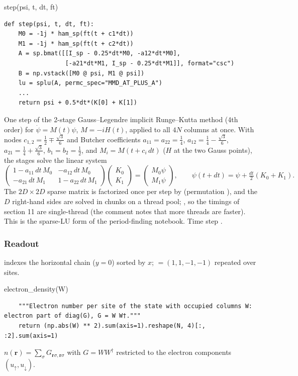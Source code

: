 \begin{function}{step(psi, t, dt, ft)}
\begin{Verbatim}
def step(psi, t, dt, ft):
    M0 = -1j * ham_sp(ft(t + c1*dt))
    M1 = -1j * ham_sp(ft(t + c2*dt))
    A = sp.bmat([[I_sp - 0.25*dt*M0, -a12*dt*M0],
                 [-a21*dt*M1, I_sp - 0.25*dt*M1]], format="csc")
    B = np.vstack([M0 @ psi, M1 @ psi])
    lu = splu(A, permc_spec="MMD_AT_PLUS_A")
    ...
    return psi + 0.5*dt*(K[0] + K[1])
\end{Verbatim}
One step of the 2-stage Gauss--Legendre implicit Runge--Kutta method (4th order) for $\dot\psi = M(t)\psi$, $M = -iH(t)$, applied to all
$4N$ columns at once. With nodes $c_{1,2} = \tfrac12\mp\tfrac{\sqrt3}{6}$ and Butcher coefficients $a_{11} = a_{22} = \tfrac14$,
$a_{12} = \tfrac14-\tfrac{\sqrt3}{6}$, $a_{21} = \tfrac14+\tfrac{\sqrt3}{6}$, $b_1 = b_2 = \tfrac12$, and $M_i = M(t + c_i\,dt)$ ($H$ at the two Gauss
points), the stages solve the linear system
\[
\begin{pmatrix} 1 - a_{11}\,dt\,M_0 & -a_{12}\,dt\,M_0\\ -a_{21}\,dt\,M_1 & 1 - a_{22}\,dt\,M_1\end{pmatrix}
\begin{pmatrix}K_0\\K_1\end{pmatrix} = \begin{pmatrix}M_0\psi\\ M_1\psi\end{pmatrix},
\qquad \psi(t+dt) = \psi + \tfrac{dt}{2}(K_0 + K_1).
\]
The $2D\times2D$ sparse matrix is factorized once per step by  (permutation ), and the $D$ right-hand sides are
solved in  chunks on a thread pool; , so the timings of section 11 are single-thread (the comment notes
that more threads are faster). This is the sparse-LU form of the period-finding notebook. Time step .
\end{function}

\subsubsection*{Readout}

 indexes the horizontal chain ($y = 0$) sorted by $x$;  $= (1,1,-1,-1)$ repeated over sites.

\begin{function}{electron\_density(W)}
\begin{Verbatim}
    """Electron number per site of the state with occupied columns W: electron part of diag(G), G = W W†."""
    return (np.abs(W) ** 2).sum(axis=1).reshape(N, 4)[:, :2].sum(axis=1)
\end{Verbatim}
$n(\mathbf r) = \sum_{\sigma}G_{\mathbf r\sigma,\mathbf r\sigma}$ with $G = WW^\dagger$ restricted to the electron components $(u_\uparrow, u_\downarrow)$.
\end{function}

